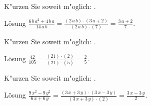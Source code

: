 \begin{MExercise}
K"urzen Sie soweit m"oglich: \: .\\ 
\begin{MHint}{L\"osung}
\quad $\frac{6\, b\, a^2 + 4\, b\, a}{14\, a\, b}=\frac{(2\, a\, b)\cdot(3\, a + 2)}{(2\, a\, b)\cdot(7)}=\frac{3\, a + 2}{7}$.\end{MHint}
 \end{MExercise}
\begin{MExercise}
K"urzen Sie soweit m"oglich: \: .\\ 
\begin{MHint}{L\"osung}
\quad $\frac{42}{105}=\frac{(21)\cdot(2)}{(21)\cdot(5)}=\frac{2}{5}$.\end{MHint}
 \end{MExercise}
\begin{MExercise}
K"urzen Sie soweit m"oglich: \: .\\ 
\begin{MHint}{L\"osung}
\quad $\frac{9\, x^2 - 9\, y^2}{6\, x + 6\, y}=\frac{(3\, x + 3\, y)\cdot(3\, x - 3\, y)}{(3\, x + 3\, y)\cdot(2)}=\frac{3\, x - 3\, y}{2}$.\end{MHint}
 \end{MExercise}
